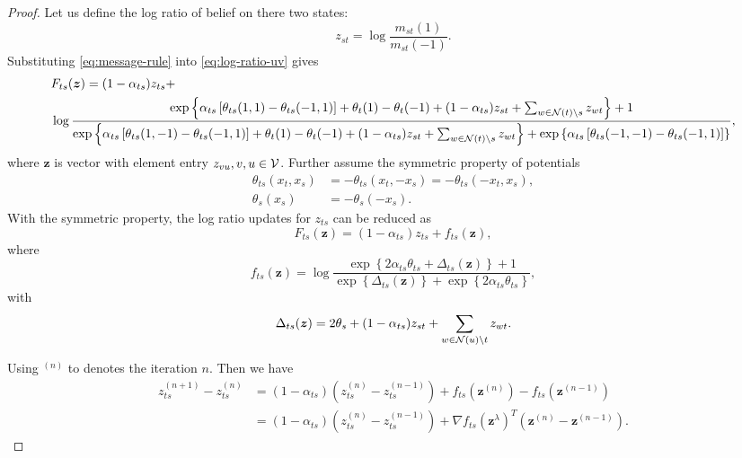 \documentclass[conference,onecolumn]{IEEEtran}
\begin{document}
\begin{proof}

  Let us define the log ratio of belief on there two states:
  \begin{equation}\label{eq:log-ratio-uv}
    z_{st} = \log\frac{m_{st}(1)}{m_{st}(-1)}.
  \end{equation}
  Substituting \eqref{eq:message-rule} into \eqref{eq:log-ratio-uv} gives
  \begin{align}
    &F_{ts}(\bm{z}) = (1- \alpha_{ts})z_{ts} + \\
    &\log\frac{\exp\left\{ \alpha_{ts}\left[ \theta_{ts}(1,1) - \theta_{ts}(-1,1) \right] + \theta_t(1) - \theta_t(-1) + (1 - \alpha_{ts})z_{st} + \sum_{w\in \mathcal{N}(t)\backslash s} z_{wt} \right\}+1}
      {\exp\left\{ \alpha_{ts}\left[ \theta_{ts}(1,-1) - \theta_{ts}(-1,1) \right] + \theta_t(1) - \theta_t(-1) + (1 - \alpha_{ts})z_{st} + \sum_{w\in \mathcal{N}(t)\backslash s} z_{wt} \right\} +
      \exp\left\{ \alpha_{ts}\left[ \theta_{ts}(-1,-1) - \theta_{ts}(-1,1) \right] \right\}},
  \end{align}
  where $\bm{z}$ is vector with element entry $z_{vu}, v,u \in \mathcal{V}$.
  Further assume the symmetric property of potentials
  \begin{align}
    \theta_{ts}(x_t, x_s) &= -\theta_{ts}(x_t, -x_s) = -\theta_{ts}(-x_t, x_s), \\
    \theta_{s}(x_s) &= - \theta_s(-x_s).
  \end{align}
  With the symmetric property, the log ratio updates for $z_{ts}$ can be reduced as
  \begin{equation}\label{eq:ratio-update}
    F_{ts}(\bm{z}) = (1-\alpha_{ts}) z_{ts} + f_{ts}(\bm{z}),
  \end{equation}
  where
  \begin{equation}
    f_{ts}(\bm{z}) = \log\frac{\exp\left\{ 2 \alpha_{ts} \theta_{ts} + \Delta_{ts}(\bm{z}) \right\}+1}
    {\exp\left\{ \Delta_{ts}(\bm{z}) \right\} +
      \exp\left\{ 2 \alpha_{ts} \theta_{ts} \right\}},
  \end{equation}
  with
  \begin{equation}
    \Delta_{ts}(\bm{z}) = 2 \theta_s + (1 - \alpha_{ts}) z_{st} + \sum_{w\in \mathcal{N}(u)\backslash t} z_{wt}.
  \end{equation}

  Using $^{(n)}$ to denotes the iteration $n$. Then we have
  \begin{align}\label{eq:ratio_diff_at_n}
    z_{ts}^{(n+1)} - z_{ts}^{(n)} &= (1-\alpha_{ts}) (z_{ts}^{(n)} - z_{ts}^{(n-1)}) + f_{ts}(\bm{z}^{(n)}) - f_{ts}(\bm{z}^{(n-1)}) \nonumber \\
                                  & = (1-\alpha_{ts}) (z_{ts}^{(n)} - z_{ts}^{(n-1)}) + \nabla f_{ts}(\bm{z}^{\lambda})^{T} (\bm{z}^{(n)} - \bm{z}^{(n-1)}).
  \end{align}


\end{proof}
\end{document}
